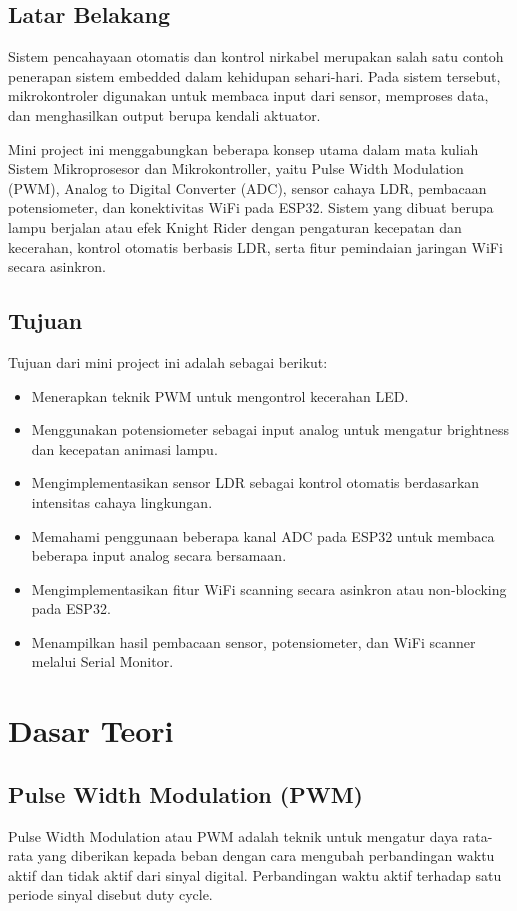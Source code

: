 \documentclass[12pt,a4paper]{article}
\begin{document}
\subsection{Latar Belakang}
Sistem pencahayaan otomatis dan kontrol nirkabel merupakan salah satu contoh penerapan sistem embedded dalam kehidupan sehari-hari. Pada sistem tersebut, mikrokontroler digunakan untuk membaca input dari sensor, memproses data, dan menghasilkan output berupa kendali aktuator.

Mini project ini menggabungkan beberapa konsep utama dalam mata kuliah Sistem Mikroprosesor dan Mikrokontroller, yaitu Pulse Width Modulation (PWM), Analog to Digital Converter (ADC), sensor cahaya LDR, pembacaan potensiometer, dan konektivitas WiFi pada ESP32. Sistem yang dibuat berupa lampu berjalan atau efek Knight Rider dengan pengaturan kecepatan dan kecerahan, kontrol otomatis berbasis LDR, serta fitur pemindaian jaringan WiFi secara asinkron.

\subsection{Tujuan}
Tujuan dari mini project ini adalah sebagai berikut:
\begin{itemize}
    \item Menerapkan teknik PWM untuk mengontrol kecerahan LED.
    \item Menggunakan potensiometer sebagai input analog untuk mengatur brightness dan kecepatan animasi lampu.
    \item Mengimplementasikan sensor LDR sebagai kontrol otomatis berdasarkan intensitas cahaya lingkungan.
    \item Memahami penggunaan beberapa kanal ADC pada ESP32 untuk membaca beberapa input analog secara bersamaan.
    \item Mengimplementasikan fitur WiFi scanning secara asinkron atau non-blocking pada ESP32.
    \item Menampilkan hasil pembacaan sensor, potensiometer, dan WiFi scanner melalui Serial Monitor.
\end{itemize}

\section{Dasar Teori}

\subsection{Pulse Width Modulation (PWM)}
Pulse Width Modulation atau PWM adalah teknik untuk mengatur daya rata-rata yang diberikan kepada beban dengan cara mengubah perbandingan waktu aktif dan tidak aktif dari sinyal digital. Perbandingan waktu aktif terhadap satu periode sinyal disebut duty cycle.
\end{document}
